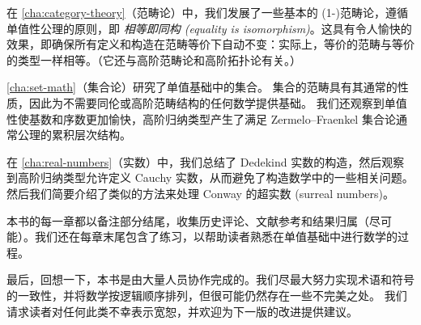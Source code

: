 在 \cref{cha:category-theory}（范畴论）中，我们发展了一些基本的 (1-)范畴论，遵循单值性公理的原则，即 \emph{相等即同构 (equality is isomorphism)}。这具有令人愉快的效果，即确保所有定义和构造在范畴等价下自动不变：实际上，等价的范畴与等价的类型一样相等。（它还与高阶范畴论和高阶拓扑论有关。）

\cref{cha:set-math}（集合论）研究了单值基础中的集合。
集合的范畴具有其通常的性质，因此为不需要同伦或高阶范畴结构的任何数学提供基础。
我们还观察到单值性使基数和序数更加愉快，高阶归纳类型产生了满足 Zermelo--Fraenkel 集合论通常公理的累积层次结构。

在 \cref{cha:real-numbers}（实数）中，我们总结了 Dedekind 实数的构造，然后观察到高阶归纳类型允许定义 Cauchy 实数，从而避免了构造数学中的一些相关问题。然后我们简要介绍了类似的方法来处理 Conway 的超实数 (surreal numbers)。

本书的每一章都以备注部分结尾，收集历史评论、文献参考和结果归属（尽可能）。我们还在每章末尾包含了练习，以帮助读者熟悉在单值基础中进行数学的过程。

最后，回想一下，本书是由大量人员协作完成的。我们尽最大努力实现术语和符号的一致性，并将数学按逻辑顺序排列，但很可能仍然存在一些不完美之处。
我们请求读者对任何此类不幸表示宽恕，并欢迎为下一版的改进提供建议。


